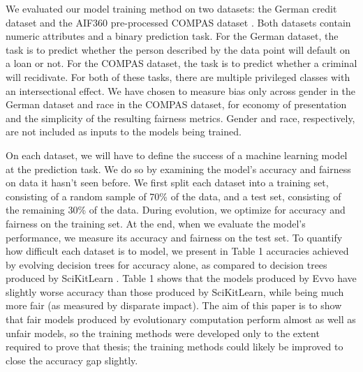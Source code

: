 \documentclass{elsarticle}
\begin{document}
We evaluated our model training method on two datasets: the German credit dataset \citep{Dua:2019} and the AIF360 pre-processed COMPAS dataset \citep{Larson:2016}. Both datasets contain numeric attributes and a binary prediction task. For the German dataset, the task is to predict whether the person described by the data point will default on a loan or not. For the COMPAS dataset, the task is to predict whether a criminal will recidivate. For both of these tasks, there are multiple privileged classes with an intersectional effect. We have chosen to measure bias only across gender in the German dataset and race in the COMPAS dataset, for economy of presentation and the simplicity of the resulting fairness metrics. Gender and race, respectively, are not included as inputs to the models being trained.

On each dataset, we will have to define the success of a machine learning model at the prediction task. We do so by examining the model’s accuracy and fairness on data it hasn’t seen before. We first split each dataset into a training set, consisting of a random sample of 70\% of the data, and a test set, consisting of the remaining 30\% of the data. During evolution, we optimize for accuracy and fairness on the training set. At the end, when we evaluate the model’s performance, we measure its accuracy and fairness on the test set. To quantify how difficult each dataset is to model, we present in Table 1 accuracies achieved by evolving decision trees for accuracy alone, as compared to decision trees produced by SciKitLearn \citep{scikit-learn}. Table 1 shows that the models produced by Evvo have slightly worse accuracy than those produced by SciKitLearn, while being much more fair (as measured by disparate impact). The aim of this paper is to show that fair models produced by evolutionary computation perform almost as well as unfair models, so the training methods were developed only to the extent required to prove that thesis; the training methods could likely be improved to close the accuracy gap slightly.
\end{document}

